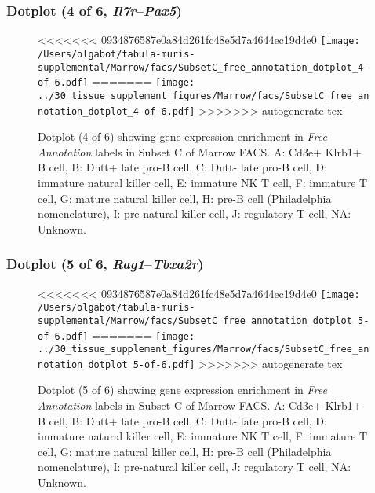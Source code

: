 \subsubsection{Dotplot (4 of 6, \emph{Il7r}--\emph{Pax5})}
\begin{figure}[h]
\centering
<<<<<<< 0934876587e0a84d261fc48e5d7a4644ec19d4e0
\texttt{[image: /Users/olgabot/tabula-muris-supplemental/Marrow/facs/SubsetC\_free\_annotation\_dotplot\_4-of-6.pdf]}
=======
\texttt{[image: ../30\_tissue\_supplement\_figures/Marrow/facs/SubsetC\_free\_annotation\_dotplot\_4-of-6.pdf]}
>>>>>>> autogenerate tex

\caption{ Dotplot (4 of 6)  showing gene expression enrichment in \emph{Free Annotation} labels in Subset C of Marrow FACS. A: Cd3e+ Klrb1+ B cell, B: Dntt+ late pro-B cell, C: Dntt- late pro-B cell, D: immature natural killer cell, E: immature NK T cell, F: immature T cell, G: mature natural killer cell, H: pre-B cell (Philadelphia nomenclature), I: pre-natural killer cell, J: regulatory T cell, NA: Unknown.}
\end{figure}


\clearpage

\subsubsection{Dotplot (5 of 6, \emph{Rag1}--\emph{Tbxa2r})}
\begin{figure}[h]
\centering
<<<<<<< 0934876587e0a84d261fc48e5d7a4644ec19d4e0
\texttt{[image: /Users/olgabot/tabula-muris-supplemental/Marrow/facs/SubsetC\_free\_annotation\_dotplot\_5-of-6.pdf]}
=======
\texttt{[image: ../30\_tissue\_supplement\_figures/Marrow/facs/SubsetC\_free\_annotation\_dotplot\_5-of-6.pdf]}
>>>>>>> autogenerate tex

\caption{ Dotplot (5 of 6)  showing gene expression enrichment in \emph{Free Annotation} labels in Subset C of Marrow FACS. A: Cd3e+ Klrb1+ B cell, B: Dntt+ late pro-B cell, C: Dntt- late pro-B cell, D: immature natural killer cell, E: immature NK T cell, F: immature T cell, G: mature natural killer cell, H: pre-B cell (Philadelphia nomenclature), I: pre-natural killer cell, J: regulatory T cell, NA: Unknown.}
\end{figure}


\clearpage

